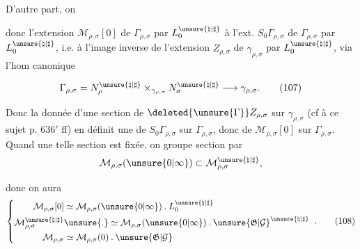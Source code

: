 D'autre part, on 

donc l'extension $\mathcal{M}_{\rho,\sigma}[0]$ de $\Gamma_{\rho,\sigma}$ par $L_0^{\unsure{\natural|\sharp}}$  à l'ext. $S_0\Gamma_{\rho,\sigma}$ de $\Gamma_{\rho,\sigma}$ par $L_0^{\unsure{\natural|\sharp}}$, i.e. à l'image inverse de l'extension $Z_{\rho,\sigma}$ de $\gamma_{\rho,\sigma}$ par $L_0^{\unsure{\natural|\sharp}}$, via l'hom canonique




\[
\Gamma_{\rho,\sigma}
=N_\rho^{\unsure{\natural|\sharp}}\mathbin{\times}_{\gamma_{\rho,\sigma}}N_\sigma^{\unsure{\natural|\sharp}}
\longrightarrow\gamma_{\rho,\sigma}.
\tag{107}
\]

Donc la donnée d'une section de $\deleted{\unsure{\Gamma}}Z_{\rho,\sigma}$ sur $\gamma_{\rho,\sigma}$ (cf à ce sujet p. $636'$ ff) en définit une de $S_0\Gamma_{\rho,\sigma}$ sur $\Gamma_{\rho,\sigma}$, donc de $\mathcal{M}_{\rho,\sigma}[0]$ sur $\Gamma_{\rho,\sigma}$. Quand une telle section est fixée, on   groupe section par
\[
\mathcal{M}_{\rho,\sigma}(\unsure{0|\infty})
\subset\mathcal{M}_{\rho,\sigma}^{\unsure{\natural|\sharp}},
\]

donc on aura
\[
\left\{\begin{aligned}
\mathcal{M}_{\rho,\sigma}[0]
&\simeq\mathcal{M}_{\rho,\sigma}(\unsure{0|\infty})\mathbin{.}L_0^{\unsure{\natural|\sharp}}\\
\mathcal{M}_{\rho,\sigma}^{\unsure{\natural|\sharp}}
&\unsure{\mathbin{.}}\simeq\mathcal{M}_{\rho,\sigma}(\unsure{0|\infty})\mathbin{.}\unsure{\mathfrak{G}|\mathcal{G}}^{\unsure{\natural|\sharp}}\\
\mathcal{M}_{\rho,\sigma}
&\simeq\mathcal{M}_{\rho,\sigma}(0)\mathbin{.}\unsure{\mathfrak{G}|\mathcal{G}}
\end{aligned}\right.
\;.
\tag{108}
\]


